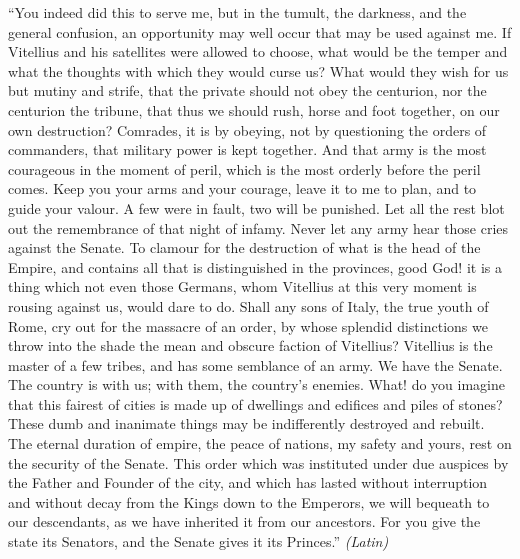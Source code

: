 ``You indeed did this to serve me, but in the tumult, the darkness, and the general confusion, an opportunity may well occur that may be used against me. If Vitellius and his satellites were allowed to choose, what would be the temper and what the thoughts with which they would curse us? What would they wish for us but mutiny and strife, that the private should not obey the centurion, nor the centurion the tribune, that thus we should rush, horse and foot together, on our own destruction? Comrades, it is by obeying, not by questioning the orders of commanders, that military power is kept together. And that army is the most courageous in the moment of peril, which is the most orderly before the peril comes. Keep you your arms and your courage, leave it to me to plan, and to guide your valour. A few were in fault, two will be punished. Let all the rest blot out the remembrance of that night of infamy. Never let any army hear those cries against the Senate. To clamour for the destruction of what is the head of the Empire, and contains all that is distinguished in the provinces, good God! it is a thing which not even those Germans, whom Vitellius at this very moment is rousing against us, would dare to do. Shall any sons of Italy, the true youth of Rome, cry out for the massacre of an order, by whose splendid distinctions we throw into the shade the mean and obscure faction of Vitellius? Vitellius is the master of a few tribes, and has some semblance of an army. We have the Senate. The country is with us; with them, the country's enemies. What! do you imagine that this fairest of cities is made up of dwellings and edifices and piles of stones? These dumb and inanimate things may be indifferently destroyed and rebuilt. The eternal duration of empire, the peace of nations, my safety and yours, rest on the security of the Senate. This order which was instituted under due auspices by the Father and Founder of the city, and which has lasted without interruption and without decay from the Kings down to the Emperors, we will bequeath to our descendants, as we have inherited it from our ancestors. For you give the state its Senators, and the Senate gives it its Princes.'' \emph{(Latin)}



